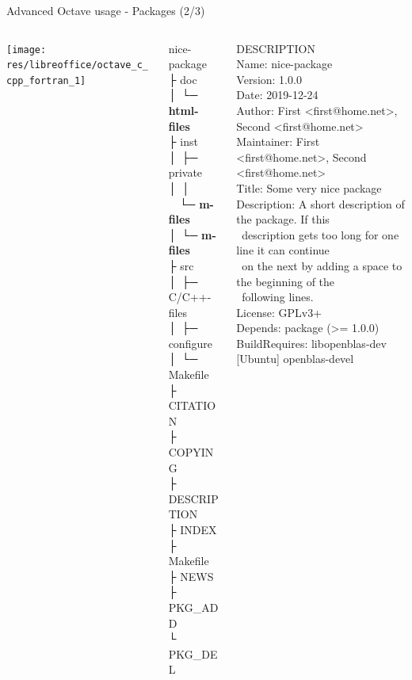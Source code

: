 \begin{frame}{Advanced Octave usage - Packages (2/3)}
\begin{columns}
\begin{column}[t]{0.2\textwidth}
\texttt{[image: res/libreoffice/octave\_c\_cpp\_fortran\_1]}
\end{column}
\begin{column}{0.2\textwidth}
\ttfamily\scriptsize
\colorbox{green!30}{nice-package} \\
├ \colorbox{orange!30}{doc} \\
│ └─ \textbf{html-files} \\
├ \colorbox{orange!30}{inst} \\
│ ├─ \colorbox{orange!30}{private} \\
│ │ \ \ └─ \textbf{m-files} \\
│ └─ \textbf{m-files} \\
├ \colorbox{orange!30}{src} \\
│ ├─ C/C++-files \\
│ ├─ configure \\
│ └─ Makefile \\
├ CITATION \\
├ {\color{red!50!black}COPYING}  \\
├ {\color{red!50!black}DESCRIPTION} \\
├ INDEX    \\
├ Makefile \\
├ NEWS     \\
├ PKG\_ADD \\
└ PKG\_DEL \\
\end{column}
\begin{column}{0.5\textwidth}
\ttfamily\tiny
\colorbox{red!30}{DESCRIPTION} \\[0.5em]
Name: nice-package \\
Version: 1.0.0 \\
Date: 2019-12-24 \\
Author: First <first@home.net>, Second <first@home.net> \\
Maintainer: First <first@home.net>, Second <first@home.net> \\
Title: Some very nice package \\
Description: A short description of the package.  If this \\
\ description gets too long for one line it can continue \\
\ on the next by adding a space to the beginning of the \\
\ following lines. \\
License: GPLv3+ \\
{\color{red!50!black}Depends: package (>= 1.0.0)} \\
BuildRequires: libopenblas-dev [Ubuntu] openblas-devel \\[2em]


\end{column}
\end{columns}
\end{frame}
